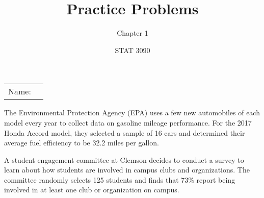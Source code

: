 \documentclass[noanswers]{exam}
\title{Practice Problems}
\author{Chapter 1}
\date{STAT 3090}
\begin{document}
\noindent\begin{tabular}{@{}p{.3in}p{3in}@{}}
Name: & \hrulefill
\end{tabular}


\begin{questions} 

	\question The Environmental Protection Agency (EPA) uses a few new automobiles of each model every year to collect data on gasoline mileage performance. For the 2017 Honda Accord model, they selected a sample of 16 cars and determined their average fuel efficiency to be 32.2 miles per gallon.
	
	\vspace{3mm}


	\question A student engagement committee at Clemson decides to conduct a survey to learn about how students are involved in campus clubs and organizations. The committee randomly selects 125 students and finds that 73\% report being involved in at least one club or organization on campus.


\end{questions}
\end{document}
